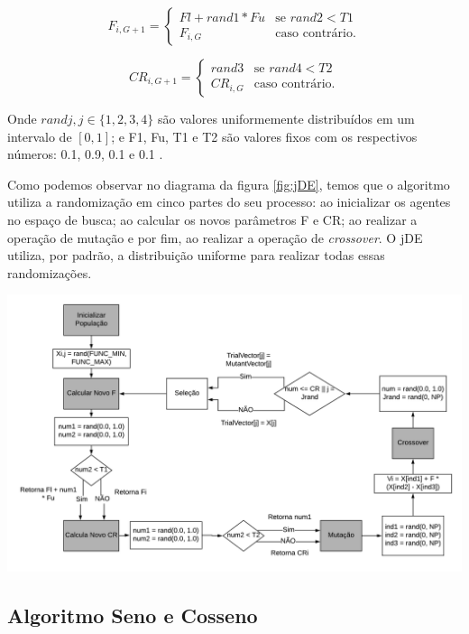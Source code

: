 \begin{equation}
F_{i,G+1} = 
\begin{cases}
    Fl + rand1 * Fu    & \text{se $rand2 < T1$}\\
    F_{i,G} & \text{caso contrário.}
\end{cases}
\end{equation}

\begin{equation}
CR_{i,G+1} = 
\begin{cases}
    rand3    & \text{se $rand4 < T2$}\\
    CR_{i,G} & \text{caso contrário.}
\end{cases}
\end{equation}

Onde $randj, j \in \{1, 2, 3, 4\}$ são valores uniformemente distribuídos em um intervalo de $[0, 1]$; e F1, Fu, T1 e T2 são valores fixos com os respectivos números: 0.1, 0.9, 0.1 e 0.1 \cite{brest}.

Como podemos observar no diagrama da figura \ref{fig:jDE}, temos que o algoritmo utiliza a randomização em cinco partes do seu processo: ao inicializar os agentes no espaço de busca; ao calcular os novos parâmetros F e CR; ao realizar a operação de mutação e por fim, ao realizar a operação de \textit{crossover}. O jDE utiliza, por padrão, a distribuição uniforme para realizar todas essas randomizações.

{
    \centering
    \includegraphics[width=1.1\linewidth]{figuras/Diagrama_de_Blocos.png}
    \label{fig:jDE}
}

\subsection{Algoritmo Seno e Cosseno}

